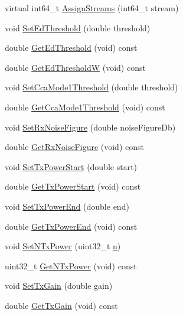 \begin{DoxyCompactItemize}
\item 
virtual int64\+\_\+t \hyperlink{classns3_1_1WifiPhy_afb67fffd3cfed4a799b1c92544dc0b55}{Assign\+Streams} (int64\+\_\+t stream)
\item 
void \hyperlink{classns3_1_1WifiPhy_ada7b3c43a2a3456ada2b622a99002042}{Set\+Ed\+Threshold} (double threshold)
\item 
double \hyperlink{classns3_1_1WifiPhy_a7d758519cd4138e8f6adc4f0c3f2a2b6}{Get\+Ed\+Threshold} (void) const 
\item 
double \hyperlink{classns3_1_1WifiPhy_aec8d35c73d4305da205e71e5f3373028}{Get\+Ed\+ThresholdW} (void) const 
\item 
void \hyperlink{classns3_1_1WifiPhy_a66c57f8c7bc8b995e98a25a3f9c82fd9}{Set\+Cca\+Mode1\+Threshold} (double threshold)
\item 
double \hyperlink{classns3_1_1WifiPhy_a811453df7799781833e091f1da58f5db}{Get\+Cca\+Mode1\+Threshold} (void) const 
\item 
void \hyperlink{classns3_1_1WifiPhy_ad570662ad0183e7427927f854da13b5b}{Set\+Rx\+Noise\+Figure} (double noise\+Figure\+Db)
\item 
double \hyperlink{classns3_1_1WifiPhy_aa25fdece132cb7ac83f95b41196fd69b}{Get\+Rx\+Noise\+Figure} (void) const 
\item 
void \hyperlink{classns3_1_1WifiPhy_af92f19ae125dbfa0473526645ba43287}{Set\+Tx\+Power\+Start} (double start)
\item 
double \hyperlink{classns3_1_1WifiPhy_a6bdd8d2fba5a318b7d35a864acdb2e20}{Get\+Tx\+Power\+Start} (void) const 
\item 
void \hyperlink{classns3_1_1WifiPhy_a98951174ec783a5ef4f63e478f08149a}{Set\+Tx\+Power\+End} (double end)
\item 
double \hyperlink{classns3_1_1WifiPhy_a888689f2b8efd16e30a87b4c11c935f7}{Get\+Tx\+Power\+End} (void) const 
\item 
void \hyperlink{classns3_1_1WifiPhy_a0b4c8e0ea1aa30cdf6111516b68a0f1a}{Set\+N\+Tx\+Power} (uint32\+\_\+t \hyperlink{lte__link__budget__x2__handover__measures_8m_abdb05bc5a064cf642a06c83b3392f148}{n})
\item 
uint32\+\_\+t \hyperlink{classns3_1_1WifiPhy_a1069909fd168072adebb5d14f0fbd046}{Get\+N\+Tx\+Power} (void) const 
\item 
void \hyperlink{classns3_1_1WifiPhy_ab99344dc30e405b377bb1c9ebeec13a9}{Set\+Tx\+Gain} (double gain)
\item 
double \hyperlink{classns3_1_1WifiPhy_a02ecf17945090f27057353bc5784f035}{Get\+Tx\+Gain} (void) const 

\end{DoxyCompactItemize}
